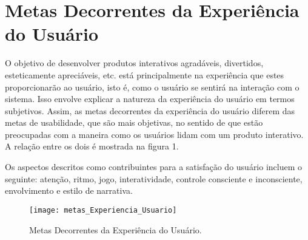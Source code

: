 \chapter[Metas Decorrentes da Experiência do Usuário]{Metas Decorrentes da Experiência do Usuário}
	\label{sec:metasExperienciaUsuario}

	O objetivo de desenvolver produtos interativos agradáveis, divertidos, esteticamente apreciáveis, etc. está principalmente na experiência que estes proporcionarão ao usuário, isto é, como o usuário se sentirá na interação com o sistema. Isso envolve explicar a natureza da experiência do usuário em termos subjetivos. Assim, as metas decorrentes da experiência do usuário diferem das metas de usabilidade, que são mais objetivas, no sentido de que estão preocupadas com a maneira como os usuários lidam com um produto interativo. A relação entre os dois é mostrada na figura 1. 

	Os aspectos descritos como contribuintes para a satisfação do usuário incluem o seguinte: atenção, ritmo, jogo, interatividade, controle consciente e inconsciente, envolvimento e estilo de narrativa.

	\begin{figure}[h]
		\centering
		\texttt{[image: metas\_Experiencia\_Usuario]}
		\caption[Metas Decorrentes da Experiência do Usuário]{Metas Decorrentes da Experiência do Usuário. \cite{designEInteracao}}
		\label{fig:metas_Experiencia_Usuario}
	\end{figure}